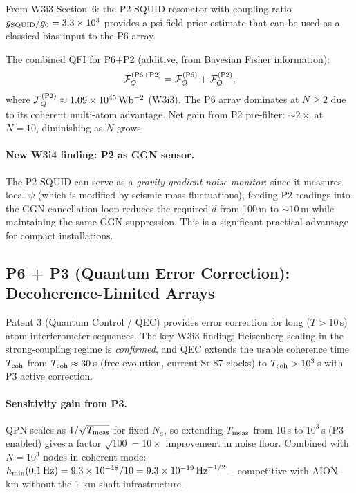 \documentclass[11pt]{article}
\theoremstyle{definition}
\theoremstyle{remark}
\newcommand{\sqrtHz}{\,\mathrm{Hz}^{-1/2}}
\newcommand{\ee}[1]{\times10^{#1}}
\begin{document}
From W3i3 Section~6: the P2 SQUID resonator with coupling ratio
$g_{\rm SQUID}/g_0 = 3.3\ee{3}$ provides a psi-field prior estimate
that can be used as a classical bias input to the P6 array.

The combined QFI for P6+P2 (additive, from Bayesian Fisher information):
\begin{equation}
\mathcal{F}_Q^{(\rm P6+P2)} = \mathcal{F}_Q^{(\rm P6)} + \mathcal{F}_Q^{(\rm P2)},
\end{equation}
where $\mathcal{F}_Q^{(\rm P2)} \approx 1.09\ee{45}\,\rm Wb^{-2}$ (W3i3).
The P6 array dominates at $N \geq 2$ due to its coherent multi-atom
advantage.  Net gain from P2 pre-filter: $\sim 2\times$ at $N = 10$,
diminishing as $N$ grows.

\paragraph{New W3i4 finding: P2 as GGN sensor.}
The P2 SQUID can serve as a \emph{gravity gradient noise monitor}: since
it measures local $\psi$ (which is modified by seismic mass fluctuations),
feeding P2 readings into the GGN cancellation loop reduces the required
$d$ from 100\,m to $\sim 10$\,m while maintaining the same GGN suppression.
This is a significant practical advantage for compact installations.

\subsection{P6 + P3 (Quantum Error Correction): Decoherence-Limited Arrays}

Patent 3 (Quantum Control / QEC) provides error correction for long
($T > 10$\,s) atom interferometer sequences.  The key W3i3 finding:
Heisenberg scaling in the strong-coupling regime is \emph{confirmed},
and QEC extends the usable coherence time $T_{\rm coh}$ from $T_{\rm coh}
\approx 30$\,s (free evolution, current Sr-87 clocks) to $T_{\rm coh}
> 10^3$\,s with P3 active correction.

\paragraph{Sensitivity gain from P3.}
QPN scales as $1/\sqrt{T_{\rm meas}}$ for fixed $N_a$, so extending
$T_{\rm meas}$ from 10\,s to $10^3$\,s (P3-enabled) gives a factor
$\sqrt{100} = 10\times$ improvement in noise floor.  Combined with $N=10^3$
nodes in coherent mode: $h_{\min}(0.1\,\rm Hz) = 9.3\ee{-18} / 10
= 9.3\ee{-19}\sqrtHz$ -- competitive with AION-km without the 1-km
shaft infrastructure.
\end{document}
